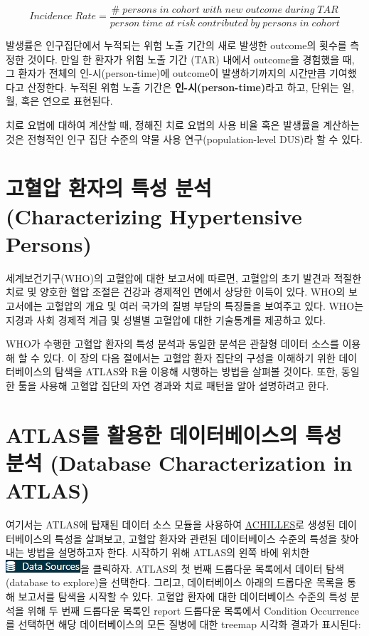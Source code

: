 \documentclass[11pt]{book}
\theoremstyle{definition}
\theoremstyle{definition}
\theoremstyle{definition}
\theoremstyle{remark}
\begin{document}
\[
Incidence\;Rate = \frac{\#\;persons\;in\;cohort\;with\;new\;outcome\;during\;TAR}{person\;time\;at\;risk\;contributed\;by\;persons\;in\;cohort}
\]

발생률은 인구집단에서 누적되는 위험 노출 기간의 새로 발생한 outcome의
횟수를 측정한 것이다. 만일 한 환자가 위험 노출 기간 (TAR) 내에서
outcome을 경험했을 때, 그 환자가 전체의 인-시(person-time)에 outcome이
발생하기까지의 시간만큼 기여했다고 산정한다. 누적된 위험 노출 기간은
\textbf{인-시(person-time)}라고 하고, 단위는 일, 월, 혹은 연으로
표현된다.  

치료 요법에 대하여 계산할 때, 정해진 치료 요법의 사용 비율 혹은 발생률을
계산하는 것은 전형적인 인구 집단 수준의 약물 사용 연구(population-level
DUS)라 할 수 있다.

\section{고혈압 환자의 특성 분석 (Characterizing Hypertensive
Persons)}\label{----characterizing-hypertensive-persons}

세계보건기구(WHO)의 고혈압에 대한 보고서\citep{WHOHypertension}에
따르면, 고혈압의 초기 발견과 적절한 치료 및 양호한 혈압 조절은 건강과
경제적인 면에서 상당한 이득이 있다. WHO의 보고서에는 고혈압의 개요 및
여러 국가의 질병 부담의 특징들을 보여주고 있다. WHO는 지경과 사회 경제적
계급 및 성별별 고혈압에 대한 기술통계를 제공하고 있다.

WHO가 수행한 고혈압 환자의 특성 분석과 동일한 분석은 관찰형 데이터
소스를 이용해 할 수 있다. 이 장의 다음 절에서는 고혈압 환자 집단의
구성을 이해하기 위한 데이터베이스의 탐색을 ATLAS와 R을 이용해 시행하는
방법을 살펴볼 것이다. 또한, 동일한 툴을 사용해 고혈압 집단의 자연 경과와
치료 패턴을 알아 설명하려고 한다.

\section{ATLAS를 활용한 데이터베이스의 특성 분석 (Database
Characterization in
ATLAS)}\label{atlas-----database-characterization-in-atlas}

여기서는 ATLAS에 탑재된 데이터 소스 모듈을 사용하여
\href{https://github.com/OHDSI/Achilles}{ACHILLES}로 생성된
데이터베이스의 특성을 살펴보고, 고혈압 환자와 관련된 데이터베이스 수준의
특성을 찾아내는 방법을 설명하고자 한다. 시작하기 위해 ATLAS의 왼쪽 바에
위치한
\includegraphics{images/Characterization/atlasDataSourcesMenuItem.png}을
클릭하자. ATLAS의 첫 번째 드롭다운 목록에서 데이터 탐색(database to
explore)을 선택한다. 그리고, 데이터베이스 아래의 드롭다운 목록을 통해
보고서를 탐색을 시작할 수 있다. 고혈압 환자에 대한 데이터베이스 수준의
특성 분석을 위해 두 번째 드롭다운 목록인 report 드롭다운 목록에서
Condition Occurrence를 선택하면 해당 데이터베이스의 모든 질병에 대한
treemap 시각화 결과가 표시된다:
\end{document}
